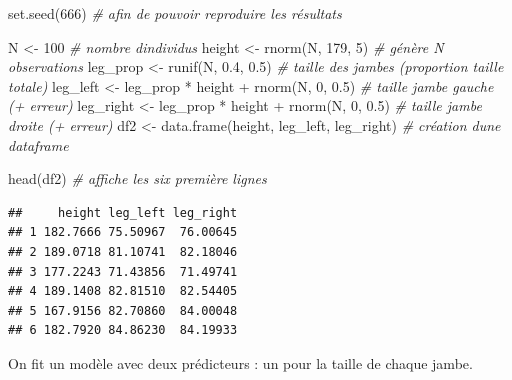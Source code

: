 \documentclass[
  a4paper,11pt,twoside,onecolumn,openright,final,oldfontcommands]{memoir}
\newenvironment{Shaded}{\begin{snugshade}}{\end{snugshade}}
\newcommand{\CommentTok}[1]{\textcolor[rgb]{0.56,0.35,0.01}{\textit{#1}}}
\newcommand{\DecValTok}[1]{\textcolor[rgb]{0.00,0.00,0.81}{#1}}
\newcommand{\FloatTok}[1]{\textcolor[rgb]{0.00,0.00,0.81}{#1}}
\newcommand{\FunctionTok}[1]{\textcolor[rgb]{0.00,0.00,0.00}{#1}}
\newcommand{\NormalTok}[1]{#1}
\newcommand{\OtherTok}[1]{\textcolor[rgb]{0.56,0.35,0.01}{#1}}
\newcommand{\SpecialCharTok}[1]{\textcolor[rgb]{0.00,0.00,0.00}{#1}}
\theoremstyle{definition}
\theoremstyle{definition}
\theoremstyle{definition}
\theoremstyle{definition}
\theoremstyle{remark}
\begin{document}
\begin{Shaded}
\begin{Highlighting}[]
\FunctionTok{set.seed}\NormalTok{(}\DecValTok{666}\NormalTok{) }\CommentTok{\# afin de pouvoir reproduire les résultats}

\NormalTok{N }\OtherTok{\textless{}{-}} \DecValTok{100} \CommentTok{\# nombre d\textquotesingle{}individus}
\NormalTok{height }\OtherTok{\textless{}{-}} \FunctionTok{rnorm}\NormalTok{(N, }\DecValTok{179}\NormalTok{, }\DecValTok{5}\NormalTok{) }\CommentTok{\# génère N observations}
\NormalTok{leg\_prop }\OtherTok{\textless{}{-}} \FunctionTok{runif}\NormalTok{(N, }\FloatTok{0.4}\NormalTok{, }\FloatTok{0.5}\NormalTok{) }\CommentTok{\# taille des jambes (proportion taille totale)}
\NormalTok{leg\_left }\OtherTok{\textless{}{-}}\NormalTok{ leg\_prop }\SpecialCharTok{*}\NormalTok{ height }\SpecialCharTok{+} \FunctionTok{rnorm}\NormalTok{(N, }\DecValTok{0}\NormalTok{, }\FloatTok{0.5}\NormalTok{) }\CommentTok{\# taille jambe gauche (+ erreur)}
\NormalTok{leg\_right }\OtherTok{\textless{}{-}}\NormalTok{ leg\_prop }\SpecialCharTok{*}\NormalTok{ height }\SpecialCharTok{+} \FunctionTok{rnorm}\NormalTok{(N, }\DecValTok{0}\NormalTok{, }\FloatTok{0.5}\NormalTok{) }\CommentTok{\# taille jambe droite (+ erreur)}
\NormalTok{df2 }\OtherTok{\textless{}{-}} \FunctionTok{data.frame}\NormalTok{(height, leg\_left, leg\_right) }\CommentTok{\# création d\textquotesingle{}une dataframe}

\FunctionTok{head}\NormalTok{(df2) }\CommentTok{\# affiche les six première lignes}
\end{Highlighting}
\end{Shaded}

\begin{verbatim}
##     height leg_left leg_right
## 1 182.7666 75.50967  76.00645
## 2 189.0718 81.10741  82.18046
## 3 177.2243 71.43856  71.49741
## 4 189.1408 82.81510  82.54405
## 5 167.9156 82.70860  84.00048
## 6 182.7920 84.86230  84.19933
\end{verbatim}

On fit un modèle avec deux prédicteurs : un pour la taille de chaque jambe.
\end{document}
